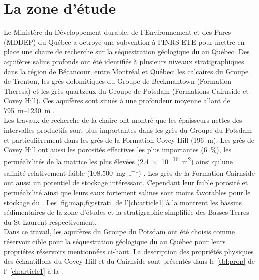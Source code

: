\section{La zone d'étude}
\label{sc:site_etude}
Le Ministère du Développement durable, de I'Environnement et des Parcs (MDDEP)
du Québec a octroyé une subvention à I'INRS-ETE pour mettre en place une chaire
de recherche sur la séquestration géologique du  au Québec. Des
aquifères salins profonds ont été identifiés à plusieurs niveaux
stratigraphiques dans la région de Bécancour, entre Montréal et Québec: les
calcaires du Groupe de Trenton, les grès dolomitiques du Groupe de Beekmantown
(Formation Theresa) et les grès quartzeux du Groupe de Potsdam (Formations
Cairnside et Covey Hill). Ces aquifères sont situés à une profondeur moyenne
allant de \SIrange{795}{1230}{\metre} \citep{INRS1}. \\
Les travaux de recherche de la chaire ont montré que les épaisseurs nettes des
intervalles productifs sont plus importantes dans les grès du Groupe du Potsdam
et particulièrement dans les grès de la Formation Covey Hill (\SI{196}{\metre}).
Les grès de Covey Hill ont aussi les porosités effectives les plus importantes
(\SI{6}{\percent}), les perméabilités de la matrice les plus élevées
(\SI{2.4e-16}{\metre\squared}) ainsi qu'une salinité relativement faible
(\SI[per-mode=symbol]{108.500}{\milli\gram\per\litre}) \citep{TranNgoc2014}. Les
grès de la Formation Cairnside ont aussi un potentiel de stockage intéressant. Cependant leur faible porosité et perméabilité ainsi que leurs
eaux fortement salines sont moins favorables pour le stockage du . Les
\cref{fig:map,fig:strati} de l'\cref{ch:article1} à la 
montrent les bassins sédimentaires de la zone d'études et la stratigraphie
simplifiée des Basses-Terres du St Laurent respectivement. \\
Dans ce travail, les aquifères du Groupe du Potsdam ont été choisis comme
réservoir cible pour la séquestration géologique du  au Québec  pour leurs propriétes réservoirs mentionnées ci-haut. La
description des propriétés physiques des échantillons du Covey Hill et du
Cairnside sont présentés dans le \cref{tbl:prop} de l' \cref{ch:article1} à la
.
